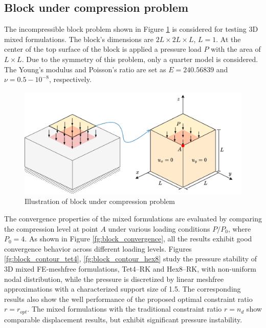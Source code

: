 \subsection{Block under compression problem}
The incompressible block problem \cite{reese2000} shown in Figure \ref{fg:block_model} is considered for testing 3D mixed formulations. The block's dimensions are $2L\times 2L \times L$, $L=1$.
At the center of the top surface of the block is applied a pressure load $P$ with the area of $L\times L$.
Due to the symmetry of this problem, only a quarter model is considered.
The Young's modulus and Poisson's ratio are set as $E = 240.56839$ and $\nu = 0.5-10^{-8}$, respectively.

\begin{figure}[H]
\centering
\includegraphics[width=\textwidth]{png/block_model_r1.png}
\caption{Illustration of block under compression problem}\label{fg:block_model}
\end{figure}

The convergence properties of the mixed formulations are evaluated by comparing the compression level at point $A$ under various loading conditions $P/P_0$, where $P_0 = 4$.
As shown in Figure \ref{fg:block_convergence}, all the results exhibit good convergence behavior across different loading levels.
Figures \ref{fg:block_contour_tet4}, \ref{fg:block_contour_hex8} study the pressure stability of 3D mixed FE-meshfree formulations, Tet4--RK and Hex8--RK, with non-uniform nodal distribution, while the pressure is discretized by linear meshfree approximations with a characterized support size of 1.5. The corresponding results also show the well performance of the proposed optimal constraint ratio $r=r_{opt}$. The mixed formulations with the traditional constraint ratio $r=n_d$ show comparable displacement results, but exhibit significant pressure instability.

